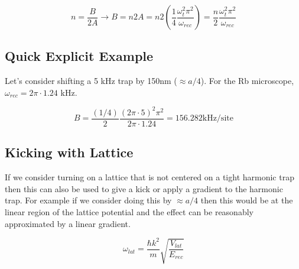 \documentclass[12pt]{article}
\begin{document}
\begin{equation}
n=\frac{B}{2A} \rightarrow B=n 2 A = n 2 \left ( \frac{1}{4} \frac{\omega_t^2 \pi^2}{\omega_{rec}} \right ) = \frac{n}{2} \frac{\omega_t^2 \pi^2}{\omega_{rec}}
\label{eq:soln}
\end{equation}

\subsection{Quick Explicit Example}

Let's consider shifting a 5 kHz trap by 150nm ($\approx a/4$). For the Rb microscope, $\omega_{rec} = 2 \pi \cdot 1.24$ kHz.

\begin{equation}
B = \frac{(1/4)}{2} \frac{(2 \pi \cdot 5)^2 \pi^2 }{2 \pi \cdot 1.24}=156.282\mathrm{ kHz/site}
\end{equation}

\subsection{Kicking with Lattice}

If we consider turning on a lattice that is not centered on a tight harmonic trap then this can also be used to give a kick or apply a gradient to the harmonic trap. For example if we consider doing this by $\approx a/4$ then this would be at the linear region of the lattice potential and the effect can be reasonably approximated by a linear gradient.



\begin{equation}
\omega_{lat} = \frac{\hbar k^2}{m}\sqrt{\frac{V_{lat}}{E_{rec}}}
\label{eq:wl}
\end{equation}
\end{document}
